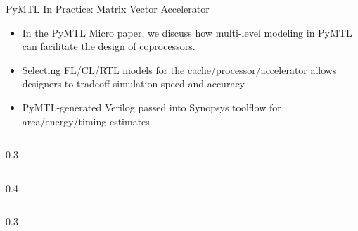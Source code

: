 \begin{frame}{PyMTL In Practice: Matrix Vector Accelerator}

\begin{itemize}
  \item In the PyMTL Micro paper, we discuss how multi-level modeling
        in PyMTL can facilitate the design of coprocessors.
  \item Selecting FL/CL/RTL models for the cache/processor/accelerator
        allows designers to tradeoff simulation speed and accuracy.
  \item PyMTL-generated Verilog passed into Synopsys toolflow for
        area/energy/timing estimates.
\end{itemize}

  \vspace{.2in}

  \begin{cbxcols}
  \begin{column}{0.3\tw}
  \end{column}

  \begin{column}{0.4\tw}
  \end{column}

  \begin{column}{0.3\tw}
  \end{column}
  \end{cbxcols}

\end{frame}


